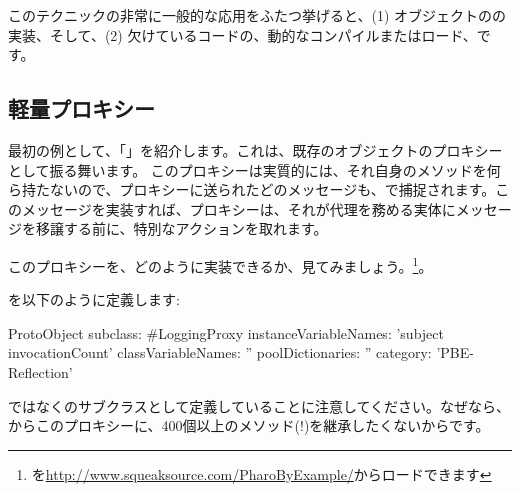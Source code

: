 \documentclass[a4paper,10pt,twoside]{book}
\begin{document}
このテクニックの非常に一般的な応用をふたつ挙げると、(1) オブジェクトのの実装、そして、(2) 欠けているコードの、動的なコンパイルまたはロード、です。

\subsection{軽量プロキシー}

最初の例として、「」を紹介します。これは、既存のオブジェクトのプロキシーとして振る舞います。
このプロキシーは実質的には、それ自身のメソッドを何ら持たないので、プロキシーに送られたどのメッセージも、で捕捉されます。このメッセージを実装すれば、プロキシーは、それが代理を務める実体にメッセージを移譲する前に、特別なアクションを取れます。

このプロキシーを、どのように実装できるか、見てみましょう。\footnote{を\url{http://www.squeaksource.com/PharoByExample/}からロードできます}。

を以下のように定義します:
\begin{code}{}
ProtoObject subclass: #LoggingProxy
	instanceVariableNames: 'subject invocationCount'
	classVariableNames: ''
	poolDictionaries: ''
	category: 'PBE-Reflection'
\end{code}
ではなくのサブクラスとして定義していることに注意してください。なぜなら、からこのプロキシーに、400個以上のメソッド(!)を継承したくないからです。
\end{document}
